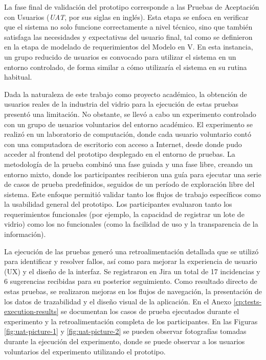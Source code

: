 La fase final de validación del prototipo corresponde a las Pruebas de Aceptación con Usuarios (\textit{UAT}, por sus siglas en inglés). Esta etapa se enfoca en verificar que el sistema no solo funcione correctamente a nivel técnico, sino que también satisfaga las necesidades y expectativas del usuario final, tal como se definieron en la etapa de modelado de requerimientos del Modelo en V. En esta instancia, un grupo reducido de usuarios es convocado para utilizar el sistema en un entorno controlado, de forma similar a cómo utilizaría el sistema en su rutina habitual. 

Dada la naturaleza de este trabajo como proyecto académico, la obtención de usuarios reales de la industria del vidrio para la ejecución de estas pruebas presentó una limitación. No obstante, se llevó a cabo un experimento controlado con un grupo de usuarios voluntarios del entorno académico. El experimento se realizó en un laboratorio de computación, donde cada usuario voluntario contó con una computadora de escritorio con acceso a Internet, desde donde pudo acceder al frontend del prototipo desplegado en el entorno de pruebas. La metodología de la prueba combinó una fase guiada y una fase libre, creando un entorno mixto, donde los participantes recibieron una guía para ejecutar una serie de casos de prueba predefinidos, seguidos de un período de exploración libre del sistema. Este enfoque permitió validar tanto los flujos de trabajo específicos como la usabilidad general del prototipo. Los participantes evaluaron tanto los requerimientos funcionales (por ejemplo, la capacidad de registrar un lote de vidrio) como los no funcionales (como la facilidad de uso y la transparencia de la información).


La ejecución de las pruebas generó una retroalimentación detallada que se utilizó para identificar y resolver fallos, así como para mejorar la experiencia de usuario (UX) y el diseño de la interfaz. Se registraron en Jira un total de 17 incidencias y 6 sugerencias recibidas para su posterior seguimiento. Como resultado directo de estas pruebas, se realizaron mejoras en los flujos de navegación, la presentación de los datos de trazabilidad y el diseño visual de la aplicación. En el Anexo \ref{cp:tests-execution-results} se documentan los casos de prueba ejecutados durante el experimento y la retroalimentación completa de los participantes. En las Figuras \ref{fig:uat-picture-1} y \ref{fig:uat-picture-2} se pueden observar fotografías tomadas durante la ejecución del experimento, donde se puede observar a los usuarios voluntarios del experimento utilizando el prototipo.

